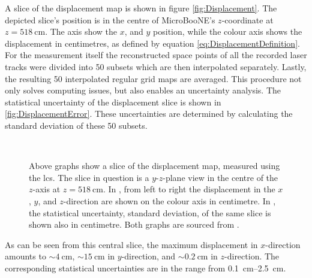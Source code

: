 A slice of the displacement map is shown in figure \ref{fig:Displacement}. The depicted slice's position is in the centre of MicroBooNE's $z$-coordinate at $z=\SI{518}{\centi\metre}$. The axis show the $x$, and $y$ position, while the colour axis shows the displacement in centimetres, as defined by equation \ref{eq:DisplacementDefinition}. For the measurement itself the reconstructed space points of all the recorded laser tracks were divided into \num{50} subsets which are then interpolated separately. Lastly, the resulting \num{50} interpolated regular grid maps are averaged. This procedure not only solves computing issues, but also enables an uncertainty analysis. The statistical uncertainty of the displacement slice is shown in \ref{fig:DisplacementError}. These uncertainties are determined by calculating the standard deviation of these \num{50} subsets.
\begin{figure}[htbp]
    \centering
     \\
    \caption[Measured Displacement in MicroBooNE using the LCS]{Above graphs show a slice of the displacement map, measured using the \gls{lcs}. The slice in question is a $y$-$z$-plane view in the centre of the $z$-axis at $z=\SI{518}{\centi\metre}$. In , from left to right the displacement in the $x$, $y$, and $z$-direction are shown on the colour axis in centimetre. In , the statistical uncertainty, \ie standard deviation, of the same slice is shown also in centimetre. Both graphs are sourced from \cite{LArLaserMicroBooNE2,LArLaserPhDYifan}.}
    \label{fig:LCSDisplacementMaps}
\end{figure}
As can be seen from this central slice, the maximum displacement in $x$-direction amounts to $\sim\SI{4}{\centi\metre}$, $\sim\SI{15}{\centi\metre}$ in $y$-direction, and $\sim\SI{0.2}{\centi\metre}$ in $z$-direction. The corresponding statistical uncertainties are in the range from \SIrange{0.1}{2.5}{\centi\metre}.

